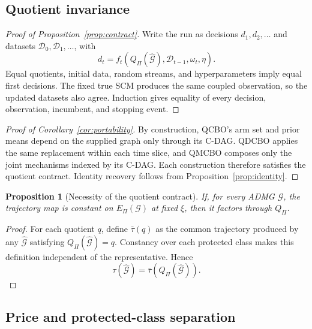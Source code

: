 \documentclass[twoside]{article}
\newtheorem{proposition}{Proposition}
\newcommand{\Gg}{\mathcal{G}}
\begin{document}
\subsection{Quotient invariance}

\begin{proof}[Proof of Proposition~\ref{prop:contract}]
Write the run as decisions \(d_1,d_2,\ldots\) and datasets \(\mathcal D_0,\mathcal D_1,\ldots\), with
\[
 d_t=f_t\!\left(
 Q_\Pi(\widehat{\Gg}),\mathcal D_{t-1},\omega_t,\eta
 \right).
\]
Equal quotients, initial data, random streams, and hyperparameters imply equal first decisions. The fixed true SCM produces the same coupled observation, so the updated datasets also agree. Induction gives equality of every decision, observation, incumbent, and stopping event.
\end{proof}

\begin{proof}[Proof of Corollary~\ref{cor:portability}]
By construction, QCBO's arm set and prior means depend on the supplied graph only through its C-DAG. QDCBO applies the same replacement within each time slice, and QMCBO composes only the joint mechanisms indexed by its C-DAG. Each construction therefore satisfies the quotient contract. Identity recovery follows from Proposition~\ref{prop:identity}.
\end{proof}

\begin{proposition}[Necessity of the quotient contract]
\label{prop:converse}
If, for every ADMG \(\Gg\), the trajectory map is constant on \(E_\Pi(\Gg)\) at fixed \(\xi\), then it factors through \(Q_\Pi\).
\end{proposition}

\begin{proof}
For each quotient \(q\), define \(\bar\tau(q)\) as the common trajectory produced by any \(\widehat{\Gg}\) satisfying \(Q_\Pi(\widehat{\Gg})=q\). Constancy over each protected class makes this definition independent of the representative. Hence
\[
 \tau(\widehat{\Gg})
 =\bar\tau\!\left(Q_\Pi(\widehat{\Gg})\right).
\]
\end{proof}

\subsection{Price and protected-class separation}
\end{document}
